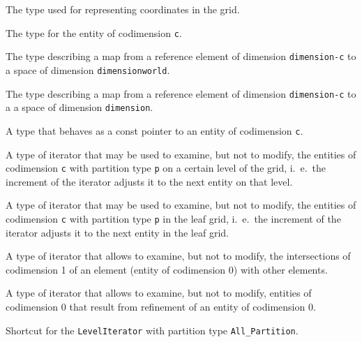 \documentclass[11pt,a4paper,headinclude,footinclude,DIV14,BCOR8.25mm,titlepage,twoside,openright,normalheadings]{scrreprt}
\begin{document}
The type used for representing coordinates in the grid.

The type for the entity of codimension \lstinline!c!.

The type describing a map from a reference element of dimension
\lstinline!dimension-c! to a space of dimension \lstinline!dimensionworld!.

The type describing a map from a reference element of dimension
\lstinline!dimension-c! to a a space of dimension \lstinline!dimension!.

A type that behaves as a const pointer to an entity of
codimension \lstinline!c!.

A type of iterator that may be used to examine, but not to modify, the
entities of codimension \lstinline!c! with partition type
\lstinline!p! on a certain level of the grid, i.~e.~the increment of
the iterator adjusts it to the next entity on that level.


A type of iterator that may be used to examine, but not to modify, the
entities of codimension \lstinline!c! with partition type
\lstinline!p! in the leaf grid, i.~e.~the increment of
the iterator adjusts it to the next entity in the leaf grid. 

A type of iterator that allows to examine, but not to modify, the
intersections of codimension 1 of an element (entity of codimension 0)
with other elements.

A type of iterator that allows to examine, but not to modify, entities
of codimension 0 that result from refinement of an entity of
codimension 0.

Shortcut for the \lstinline!LevelIterator! with partition type
\lstinline!All_Partition!. 
\end{document}
